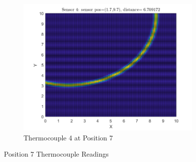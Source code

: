 \documentclass[12pt]{article}
\begin{document}
\begin{figure}[H]
\begin{subfigure}[h]{0.4\textwidth}
        \includegraphics[width=\textwidth]{images/P7S4.png}
        \caption{Thermocouple 4 at Position 7}
        \label{fig:P7S4}
    \end{subfigure}
\caption{Position 7 Thermocouple Readings}
\label{fig:P7}
\end{figure}
\end{document}
